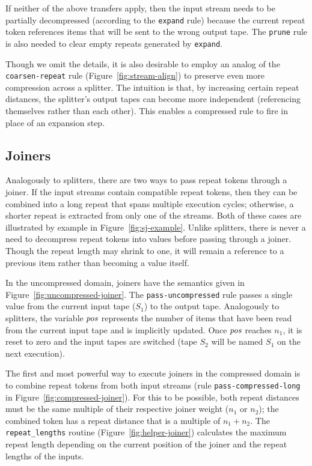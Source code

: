 If neither of the above transfers apply, then the input stream needs
to be partially decompressed (according to the {\tt expand} rule)
because the current repeat token references items that will be sent to
the wrong output tape.  The {\tt prune} rule is also needed to clear
empty repeats generated by {\tt expand}.

Though we omit the details, it is also desirable to employ an analog
of the {\tt coarsen-repeat} rule (Figure~\ref{fig:stream-align}) to
preserve even more compression across a splitter.  The intuition is
that, by increasing certain repeat distances, the splitter's output
tapes can become more independent (referencing themselves rather than
each other).  This enables a compressed rule to fire in place of an
expansion step.

\subsection{Joiners}

Analogously to splitters, there are two ways to pass repeat tokens
through a joiner.  If the input streams contain compatible repeat
tokens, then they can be combined into a long repeat that spans
multiple execution cycles; otherwise, a shorter repeat is extracted
from only one of the streams.  Both of these cases are illustrated by
example in Figure~\ref{fig:sj-example}.  Unlike splitters, there is
never a need to decompress repeat tokens into values before passing
through a joiner.  Though the repeat length may shrink to one, it will
remain a reference to a previous item rather than becoming a value
itself.

In the uncompressed domain, joiners have the semantics given in
Figure~\ref{fig:uncompressed-joiner}.  The {\tt pass-uncompressed}
rule passes a single value from the current input tape ($S_1$) to the
output tape.  Analogously to splitters, the variable $\mbox{\it pos}$ represents
the number of items that have been read from the current input tape
and is implicitly updated.  Once $\mbox{\it pos}$ reaches $n_1$, it is reset to
zero and the input tapes are switched (tape $S_2$ will be named $S_1$
on the next execution).

The first and most powerful way to execute joiners in the compressed
domain is to combine repeat tokens from both input streams
%
\clearpage\noindent\clearpage\noindent %
%
(rule {\tt pass-compressed-long} in
Figure~\ref{fig:compressed-joiner}).  For this to be possible, both
repeat distances must be the same multiple of their respective joiner
weight ($n_1$ or $n_2$); the combined token has a repeat distance that
is a multiple of $n_1 + n_2$.  The {\tt repeat\_lengths} routine
(Figure~\ref{fig:helper-joiner}) calculates the maximum repeat length
depending on the current position of the joiner and the repeat lengths
of the inputs.

